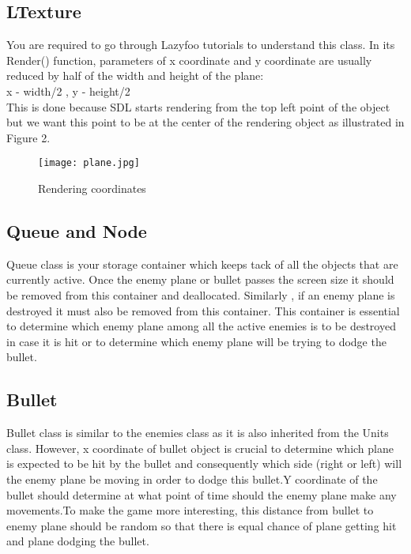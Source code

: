 \documentclass[11pt,fleqn]{book} %
\begin{document}
 \subsection{LTexture}
 You are required to go through Lazyfoo tutorials to understand this class.
 In its Render() function, parameters of x coordinate and y coordinate are usually reduced by half of the width and height of the plane:\\
 
 x - width/2 , y - height/2\\
 \hfill \break
 This is done because SDL starts rendering from the top left point of the object but we want this point to be at the center of the rendering object as illustrated in Figure 2.
 
 \begin{figure}[h]
 	\centering\texttt{[image: plane.jpg]}
 	\caption{Rendering coordinates}
 \end{figure}
 
 \subsection{Queue and Node}
 Queue class is your storage container which keeps tack of all the objects that are currently active. Once the enemy plane or bullet passes the screen size it should be removed from this container and deallocated. Similarly , if an enemy plane is destroyed it must also be removed from this container. This container is essential to determine which enemy plane among all the active enemies is to be destroyed in case it is hit or to determine which enemy plane will be trying to dodge the bullet. 
 
 \subsection{Bullet}
 Bullet class is similar to the enemies class as it is also inherited from the Units class. However, x coordinate of bullet object is crucial to determine which plane is expected to be hit by the bullet and consequently which side (right or left) will the enemy plane be moving in order to dodge this bullet.Y coordinate of the bullet should determine at what point of time should the enemy plane make any movements.To make the game more interesting, this distance from bullet to enemy plane should be random so that there is equal chance of plane getting hit and plane dodging the bullet.
 
\end{document}
